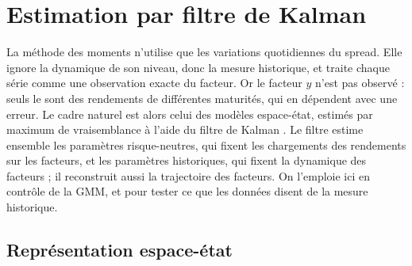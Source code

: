 \section{Estimation par filtre de Kalman}
\label{sec:kalman}

La méthode des moments n'utilise que les variations quotidiennes du spread. Elle ignore la dynamique de son
niveau, donc la mesure historique, et traite chaque série comme une observation exacte du facteur. Or le facteur
$y$ n'est pas observé : seuls le sont des rendements de différentes maturités, qui en dépendent avec une erreur.
Le cadre naturel est alors celui des modèles espace-état, estimés par maximum de vraisemblance à l'aide du filtre
de Kalman \citep[cours~5, section~I.2]{MPR2025}. Le filtre estime ensemble les paramètres risque-neutres, qui
fixent les chargements des rendements sur les facteurs, et les paramètres historiques, qui fixent la dynamique
des facteurs ; il reconstruit aussi la trajectoire des facteurs. On l'emploie ici en contrôle de la GMM, et pour
tester ce que les données disent de la mesure historique.

\subsection{Représentation espace-état}

